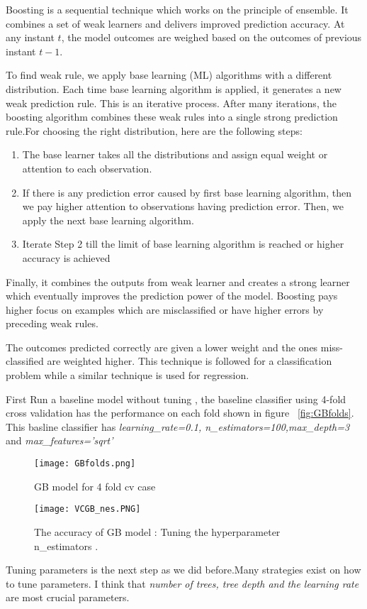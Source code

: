 \documentclass{article}
\begin{document}
Boosting is a sequential technique which works on the principle of ensemble. It combines a set of weak learners and delivers improved prediction accuracy. At any instant $t$, the model outcomes are weighed based on the outcomes of previous instant $t-1$. 

To find weak rule, we apply base learning (ML) algorithms with a different distribution. Each time base learning algorithm is applied, it generates a new weak prediction rule. This is an iterative process. After many iterations, the boosting algorithm combines these weak rules into a single strong prediction rule.For choosing the right distribution, here are the following steps:
\begin{enumerate}
	\item The base learner takes all the distributions and assign equal weight or attention to each observation.
	\item If there is any prediction error caused by first base learning algorithm, then we pay higher attention to observations having prediction error. Then, we apply the next base learning algorithm.
	\item Iterate Step 2 till the limit of base learning algorithm is reached or higher accuracy is achieved
\end{enumerate}
Finally, it combines the outputs from weak learner and creates  a strong learner which eventually improves the prediction power of the model. Boosting pays higher focus on examples which are misclassified or have higher errors by preceding weak rules. 

The outcomes predicted correctly are given a lower weight and the ones miss-classified are weighted higher. This technique is followed for a classification problem while a similar technique is used for regression.

First Run a baseline model without tuning , the baseline classifier using 4-fold cross validation has the performance   on each fold shown in figure ~\ref{fig:GBfolds}. This basline classifier has \textit{learning\_rate=0.1, n\_estimators=100,max\_depth=3} and \textit{max\_features='sqrt'}
\begin{figure}[H]
	\centering
	\begin{minipage}{0.45\textwidth}
			\centering		
		\texttt{[image: GBfolds.png]}\caption{\footnotesize GB model for 4 fold cv case}
		\label{fig:GBfolds}	
	\end{minipage}\hfill
	\begin{minipage}{0.45\textwidth}
			\centering
		\texttt{[image: VCGB\_nes.PNG]}\caption{{\small The accuracy of GB model : Tuning the hyperparameter n\_estimators .}}
		\label{fig:VCGB_nes}
	\end{minipage}
\end{figure} 
Tuning parameters is the next step as we did before.Many strategies exist on how to tune parameters. I think that \textit{number of trees, tree depth and the learning rate } are most crucial parameters.
\end{document}

